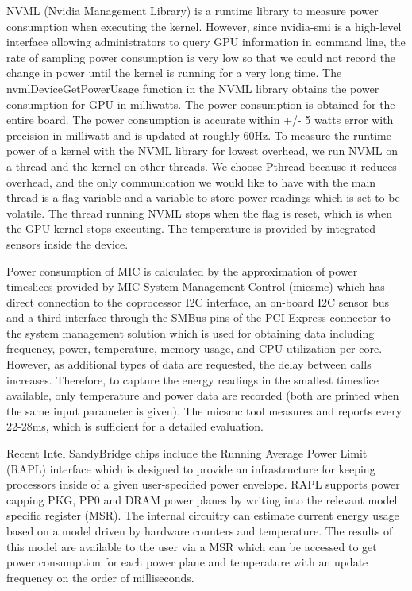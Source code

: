 NVML (Nvidia Management Library) \cite{R:16} is a runtime library to measure power consumption when executing the kernel. However, since nvidia-smi is a high-level interface allowing administrators to query GPU information in command line, the rate of sampling power consumption is very low so that we could not record the change in power until the kernel is running for a very long time. The nvmlDeviceGetPowerUsage function in the NVML library obtains the power consumption  for GPU in milliwatts. The power consumption is obtained for the entire board. The power consumption is accurate within +/- 5 watts error with precision in milliwatt and is updated at roughly 60Hz. To measure the runtime power of a kernel with the NVML library for lowest overhead, we run NVML on a thread and the kernel on other threads. We choose Pthread because it reduces overhead, and the only communication we would like to have with the main thread is a flag variable and a variable to store power readings which is set to be volatile. The thread running NVML stops when the flag is reset, which is when the GPU kernel stops executing. The temperature is provided by integrated sensors inside the device.

 Power consumption of MIC is calculated by the approximation of power timeslices provided by MIC System Management Control (micsmc) \cite{R:17} which has direct connection to the coprocessor I2C interface, an on-board I2C sensor bus and a third interface through the SMBus pins of the PCI Express connector to the system management solution which is used for obtaining data including frequency, power, temperature, memory usage, and CPU utilization per core. However, as additional types of data are requested, the delay between calls increases. Therefore, to capture the energy readings in the smallest timeslice available, only temperature and power data are recorded (both are printed when the same input parameter is given). The micsmc tool measures and reports every 22-28ms, which is sufficient for a detailed evaluation. 

 Recent Intel SandyBridge chips include the Running Average Power Limit (RAPL) interface \cite{R:15} which is designed to provide an infrastructure for keeping processors inside of a given user-specified power envelope. RAPL supports power capping PKG, PP0 and DRAM power planes by writing into the relevant model specific register (MSR). The internal circuitry can estimate current energy usage based on a model driven by hardware counters and temperature. The results of this model are available to the user via a MSR which can be accessed to get power consumption for each power plane and temperature with an update frequency on the order of milliseconds. 



